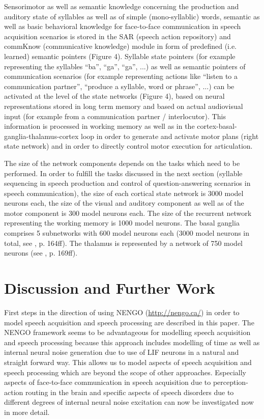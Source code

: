 \documentclass[conference]{IEEEtran}
\begin{document}
Sensorimotor as well as semantic knowledge concerning the production
and auditory state of syllables as well as of simple (mono-syllablic)
words, semantic as well as basic behavioral knowledge for face-to-face
communication in speech acquisition scenarios is stored in the SAR
(speech action repository) and commKnow (communicative knowledge)
module in form of predefined (i.e. learned) semantic pointers (Figure
4). Syllable state pointers (for example representing the syllables
``ba'', ``ga'', ``ga'', ...) as well as semantic pointers of
communication scenarios (for example representing actions like
``listen to a communication partner'', ``produce a syllable, word or
phrase'', ...) can be activated at the level of the state networks
(Figure 4), based on neural representations stored in long term memory
and based on actual audiovisual input (for example from a
communication partner / interlocutor). This information is processed
in working memory as well as in the
cortex-basal-ganglia-thalamus-cortex loop in order to generate and
activate motor plans (right state network) and in order to directly
control motor execution for articulation.

The size of the network components depends on the tasks which need to
be performed. In order to fulfill the tasks discussed in the next
section (syllable sequencing in speech production and control of
question-answering scenarios in speech communication), the size of
each cortical state network is 3000 model neurons each, the size of
the visual and auditory component as well as of the motor component is
300 model neurons each. The size of the recurrent network representing
the working memory is 1000 model neurons. The basal ganglia comprises
5 subnetworks with 600 model neurons each (3000 model neurons in
total, see \cite{eliasmith2013}, p. 164ff). The thalamus is
represented by a network of 750 model neurons (see
\cite{eliasmith2013}, p. 169ff).

\section{Discussion and Further Work}

First steps in the direction of using NENGO (\url{http://nengo.ca/})
in order to model speech acquisition and speech processing are
described in this paper. The NENGO framework seems to be advantageous
for modelling speech acquisition and speech processing because this
approach includes modelling of time as well as internal neural noise
generation due to use of LIF neurons in a natural and straight forward
way. This allows us to model aspects of speech acquisition and speech
processing which are beyond the scope of other approaches. Especially
aspects of face-to-face communication in speech acquisition due to
perception-action routing in the brain and specific aspects of speech
disorders due to different degrees of internal neural noise excitation
can now be investigated now in more detail.
\end{document}
